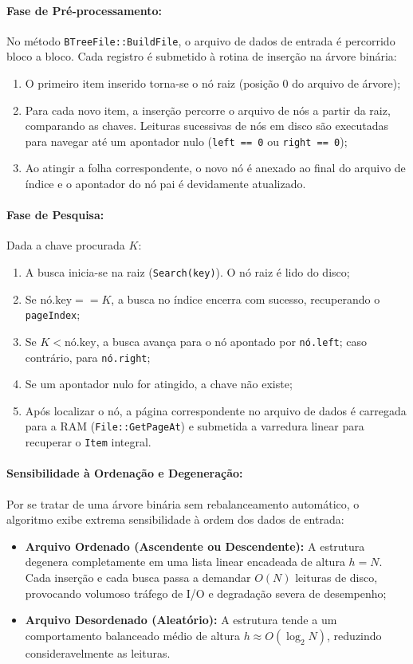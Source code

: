 \documentclass[12pt,a4paper]{article}
\begin{document}
\paragraph{Fase de Pré-processamento:}
No método \texttt{BTreeFile::BuildFile}, o arquivo de dados de entrada é percorrido bloco a bloco. Cada registro é submetido à rotina de inserção na árvore binária:
\begin{enumerate}
    \item O primeiro item inserido torna-se o nó raiz (posição 0 do arquivo de árvore);
    \item Para cada novo item, a inserção percorre o arquivo de nós a partir da raiz, comparando as chaves. Leituras sucessivas de nós em disco são executadas para navegar até um apontador nulo (\texttt{left == 0} ou \texttt{right == 0});
    \item Ao atingir a folha correspondente, o novo nó é anexado ao final do arquivo de índice e o apontador do nó pai é devidamente atualizado.
\end{enumerate}

\paragraph{Fase de Pesquisa:}
Dada a chave procurada $K$:
\begin{enumerate}
    \item A busca inicia-se na raiz (\texttt{Search(key)}). O nó raiz é lido do disco;
    \item Se $\text{nó.key} == K$, a busca no índice encerra com sucesso, recuperando o \texttt{pageIndex};
    \item Se $K < \text{nó.key}$, a busca avança para o nó apontado por \texttt{nó.left}; caso contrário, para \texttt{nó.right};
    \item Se um apontador nulo for atingido, a chave não existe;
    \item Após localizar o nó, a página correspondente no arquivo de dados é carregada para a RAM (\texttt{File::GetPageAt}) e submetida a varredura linear para recuperar o \texttt{Item} integral.
\end{enumerate}

\paragraph{Sensibilidade à Ordenação e Degeneração:}
Por se tratar de uma árvore binária sem rebalanceamento automático, o algoritmo exibe extrema sensibilidade à ordem dos dados de entrada:
\begin{itemize}
    \item \textbf{Arquivo Ordenado (Ascendente ou Descendente):} A estrutura degenera completamente em uma lista linear encadeada de altura $h = N$. Cada inserção e cada busca passa a demandar $O(N)$ leituras de disco, provocando volumoso tráfego de I/O e degradação severa de desempenho;
    \item \textbf{Arquivo Desordenado (Aleatório):} A estrutura tende a um comportamento balanceado médio de altura $h \approx O(\log_2 N)$, reduzindo consideravelmente as leituras.
\end{itemize}
\end{document}

